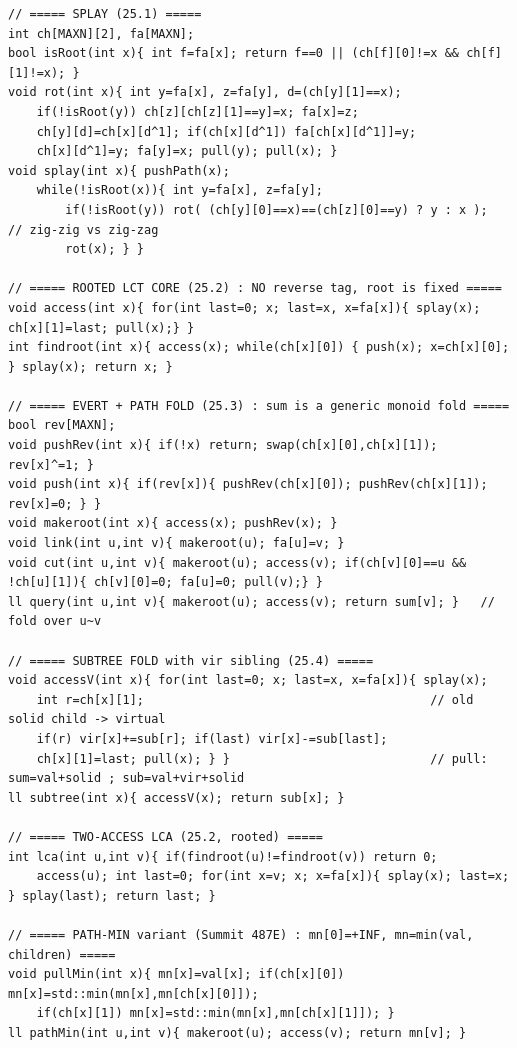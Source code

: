 \begin{lstlisting}[caption={Chapter 25 kit: the splay rotate-and-splay, the rooted LCT core (isRoot, access, findroot), evert with its reverse tag plus link/cut/path-query, the subtree fold with its vir sibling, the two-access LCA, and a path-min variant -- one compact skeleton each, in one place. ASCII only, identifiers spelled without underscores.}, label={lst:c23-kit}]
// ===== SPLAY (25.1) =====
int ch[MAXN][2], fa[MAXN];
bool isRoot(int x){ int f=fa[x]; return f==0 || (ch[f][0]!=x && ch[f][1]!=x); }
void rot(int x){ int y=fa[x], z=fa[y], d=(ch[y][1]==x);
    if(!isRoot(y)) ch[z][ch[z][1]==y]=x; fa[x]=z;
    ch[y][d]=ch[x][d^1]; if(ch[x][d^1]) fa[ch[x][d^1]]=y;
    ch[x][d^1]=y; fa[y]=x; pull(y); pull(x); }
void splay(int x){ pushPath(x);
    while(!isRoot(x)){ int y=fa[x], z=fa[y];
        if(!isRoot(y)) rot( (ch[y][0]==x)==(ch[z][0]==y) ? y : x );  // zig-zig vs zig-zag
        rot(x); } }

// ===== ROOTED LCT CORE (25.2) : NO reverse tag, root is fixed =====
void access(int x){ for(int last=0; x; last=x, x=fa[x]){ splay(x); ch[x][1]=last; pull(x);} }
int findroot(int x){ access(x); while(ch[x][0]) { push(x); x=ch[x][0]; } splay(x); return x; }

// ===== EVERT + PATH FOLD (25.3) : sum is a generic monoid fold =====
bool rev[MAXN];
void pushRev(int x){ if(!x) return; swap(ch[x][0],ch[x][1]); rev[x]^=1; }
void push(int x){ if(rev[x]){ pushRev(ch[x][0]); pushRev(ch[x][1]); rev[x]=0; } }
void makeroot(int x){ access(x); pushRev(x); }
void link(int u,int v){ makeroot(u); fa[u]=v; }
void cut(int u,int v){ makeroot(u); access(v); if(ch[v][0]==u && !ch[u][1]){ ch[v][0]=0; fa[u]=0; pull(v);} }
ll query(int u,int v){ makeroot(u); access(v); return sum[v]; }   // fold over u~v

// ===== SUBTREE FOLD with vir sibling (25.4) =====
void accessV(int x){ for(int last=0; x; last=x, x=fa[x]){ splay(x);
    int r=ch[x][1];                                        // old solid child -> virtual
    if(r) vir[x]+=sub[r]; if(last) vir[x]-=sub[last];
    ch[x][1]=last; pull(x); } }                            // pull: sum=val+solid ; sub=val+vir+solid
ll subtree(int x){ accessV(x); return sub[x]; }

// ===== TWO-ACCESS LCA (25.2, rooted) =====
int lca(int u,int v){ if(findroot(u)!=findroot(v)) return 0;
    access(u); int last=0; for(int x=v; x; x=fa[x]){ splay(x); last=x; } splay(last); return last; }

// ===== PATH-MIN variant (Summit 487E) : mn[0]=+INF, mn=min(val, children) =====
void pullMin(int x){ mn[x]=val[x]; if(ch[x][0]) mn[x]=std::min(mn[x],mn[ch[x][0]]);
    if(ch[x][1]) mn[x]=std::min(mn[x],mn[ch[x][1]]); }
ll pathMin(int u,int v){ makeroot(u); access(v); return mn[v]; }
\end{lstlisting}


